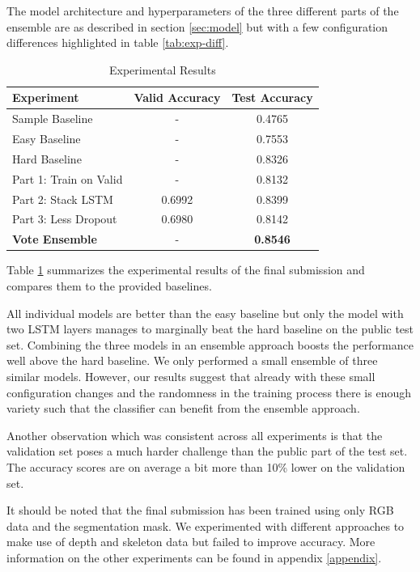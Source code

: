 The model architecture and hyperparameters of the three different parts of the ensemble are as described in section \ref{sec:model} but with a few configuration differences highlighted in table \ref{tab:exp-diff}.

\begin{table}[h!]
  \caption{Experimental Results}
  \label{tab:exp-res}
  \begin{tabular}{lcc}
    \toprule
    Experiment & Valid Accuracy & Test Accuracy \\
    \midrule
    Sample Baseline & - & 0.4765 \\
    Easy Baseline &  - & 0.7553 \\
    Hard Baseline & - & 0.8326 \\
    \midrule
    Part 1: Train on Valid & - & 0.8132    \\
    Part 2: Stack LSTM  & 0.6992 & 0.8399           \\
    Part 3: Less Dropout & 0.6980 & 0.8142          \\
    \textbf{Vote Ensemble}  & - & \textbf{0.8546}  \\
  \bottomrule
\end{tabular}
\end{table}


Table \ref{tab:exp-res} summarizes the experimental results of the final submission and compares them to the provided baselines.

All individual models are better than the easy baseline but only the model with two LSTM layers manages to marginally beat the hard baseline on the public test set.
Combining the three models in an ensemble approach boosts the performance well above the hard baseline.
We only performed a small ensemble of three similar models. However, our results suggest that already with these small configuration changes and the randomness in the training process there is enough variety such that the classifier can benefit from the ensemble approach.

Another observation which was consistent across all experiments is that the validation set poses a much harder challenge than the public part of the test set. The accuracy scores are on average a bit more than 10\% lower on the validation set.

It should be noted that the final submission has been trained using only RGB data and the segmentation mask. We experimented with different approaches to make use of depth and skeleton data but failed to improve accuracy. More information on the other experiments can be found in appendix \ref{appendix}.


